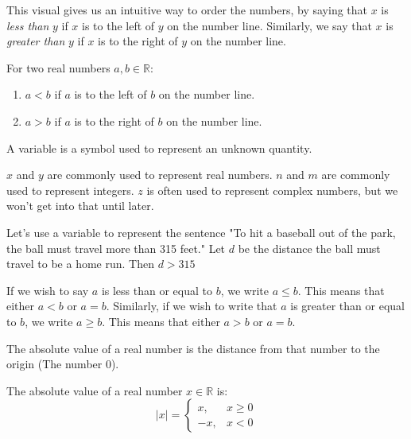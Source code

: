 \documentclass[crop=false,class=book,oneside]{standalone}                      %
\begin{document}
        This visual gives us an intuitive way to order the numbers,
        by saying that $x$ is \textit{less than} $y$ if $x$ is
        to the left of $y$ on the number line. Similarly, we say
        that $x$ is \textit{greater than} $y$ if $x$ is to the
        right of $y$ on the number line.
        \begin{properties}
            For two real numbers $a,b\in \mathbb{R}$:
            \begin{enumerate}
                \item $a<b$ if $a$ is to the left of $b$ on the number line.
                \item $a>b$ if $a$ is to the right of $b$ on the number line.
            \end{enumerate}
        \end{properties}
        \begin{definition}
        A variable is a symbol used to represent an unknown quantity.
        \end{definition}
        \begin{example}
        $x$ and $y$ are commonly used to represent real numbers. $n$ and $m$ are commonly used to represent integers. $z$ is often used to represent complex numbers, but we won't get into that until later.
        \end{example}
        \begin{example}
        Let's use a variable to represent the sentence "To hit a baseball out of the park, the ball must travel more than 315 feet." Let $d$ be the distance the ball must travel to be a home run. Then $d>315$
        \end{example}
        \begin{notation}
        If we wish to say $a$ is less than or equal to $b$, we write $a\leq b$. This means that either $a<b$ or $a=b$. Similarly, if we wish to write that $a$ is greater than or equal to $b$, we write $a\geq b$. This means that either $a>b$ or $a=b$.
        \end{notation}
        The absolute value of a real number is the distance from that number to the origin (The number $0$).
        \begin{definition}
            The absolute value of a real number
            $x\in \mathbb{R}$ is:
            \begin{equation}
                |x|=
                \begin{cases}
                    x,&x\geq{0}\\
                    \minus{x},&x<0
                \end{cases}
            \end{equation}
        \end{definition}
\end{document}

